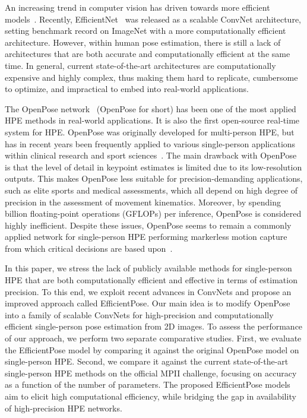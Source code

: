 An increasing trend in computer vision has driven towards more efficient models~\cite{sandler2018mobilenetv2, tan2019mnasnet, elsen2019fast}. Recently, EfficientNet~\cite{tan2019efficientnet} was released as a scalable ConvNet architecture, setting benchmark record on ImageNet with a more computationally efficient architecture. However, within human pose estimation, there is still a lack of architectures that are both accurate and computationally efficient at the same time. In general, current state-of-the-art architectures are computationally expensive and highly complex, thus making them hard to replicate, cumbersome to optimize, and impractical to embed into real-world applications. 

The OpenPose network~\cite{cao2018openpose} (OpenPose for short) has been one of the most applied HPE methods in real-world applications. It is also the first open-source real-time system for HPE. OpenPose was originally developed for multi-person HPE, but has in recent years been frequently applied to various single-person applications within clinical research and sport sciences~\cite{nakai2018prediction, noori2019robust, firdaus2019recognizing}. The main drawback with OpenPose is that the level of detail in keypoint estimates is limited due to its low-resolution outputs. This makes OpenPose less suitable for precision-demanding applications, such as elite sports and medical assessments, which all depend on high degree of precision in the assessment of movement kinematics. Moreover, by spending  billion floating-point operations (GFLOPs) per inference, OpenPose is considered highly inefficient. Despite these issues, OpenPose seems to remain a commonly applied network for single-person HPE performing markerless motion capture from which critical decisions are based upon~\cite{vitali2019new, barra2019gait}. 

In this paper, we stress the lack of publicly available methods for single-person HPE that are both computationally efficient and effective in terms of estimation precision. To this end, we exploit recent advances in ConvNets and propose an improved approach called EfficientPose. Our main idea is to modify OpenPose into a family of scalable ConvNets for high-precision and computationally efficient single-person pose estimation from 2D images. To assess the performance of our approach, we perform two separate comparative studies. First, we evaluate the EfficientPose model by comparing it against the original OpenPose model on single-person HPE. Second, we compare it against the current state-of-the-art single-person HPE methods on the official MPII challenge, focusing on accuracy as a function of the number of parameters. The proposed EfficientPose models aim to elicit high computational efficiency, while bridging the gap in availability of high-precision HPE networks.

